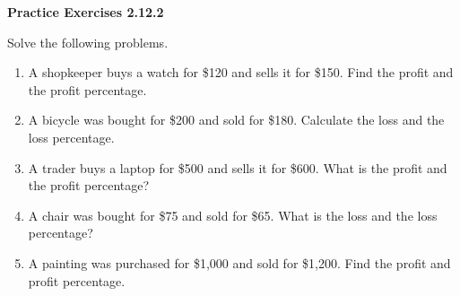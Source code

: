  \vspace{0.2ex}
\noindent\textbf{Practice Exercises 2.12.2}

\vspace{0.2ex}

Solve the following problems. 
\begin{enumerate}[noitemsep, label = \color{blue}\arabic*. ]
    \item A shopkeeper buys a watch for \$120 and sells it for \$150. Find the profit and the profit percentage.
    \item A bicycle was bought for \$200 and sold for \$180. Calculate the loss and the loss percentage.
    \item A trader buys a laptop for \$500 and sells it for \$600. What is the profit and the profit percentage?
    \item A chair was bought for \$75 and sold for \$65. What is the loss and the loss percentage?
    \item A painting was purchased for \$1,000 and sold for \$1,200. Find the profit and profit percentage.
\end{enumerate}

